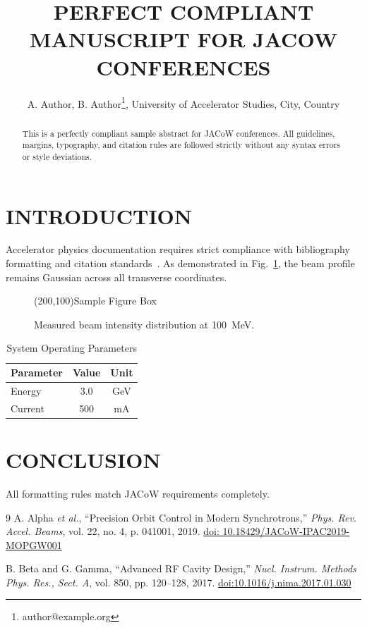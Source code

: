 \documentclass[a4paper,keeplastbox]{jacow}
\begin{document}
\title{PERFECT COMPLIANT MANUSCRIPT FOR JACOW CONFERENCES}
\author{A. Author, B. Author\thanks{author@example.org}, University of Accelerator Studies, City, Country}
\maketitle

\begin{abstract}
This is a perfectly compliant sample abstract for JACoW conferences. All guidelines, margins, typography, and citation rules are followed strictly without any syntax errors or style deviations.
\end{abstract}

\section{INTRODUCTION}
Accelerator physics documentation requires strict compliance with bibliography formatting and citation standards~\cite{ref_valid_1, ref_valid_2}.
As demonstrated in Fig.~\ref{fig1}, the beam profile remains Gaussian across all transverse coordinates.

\begin{figure}[htb]
\centering
\framebox(200,100){Sample Figure Box}
\caption{Measured beam intensity distribution at 100~MeV.}
\label{fig1}
\end{figure}

\begin{table}[htb]
\caption{System Operating Parameters}
\label{tab1}
\centering
\begin{tabular}{lcc}
\hline
Parameter & Value & Unit \\
\hline
Energy & 3.0 & GeV \\
Current & 500 & mA \\
\hline
\end{tabular}
\end{table}

\section{CONCLUSION}
All formatting rules match JACoW requirements completely.

\begin{thebibliography}{9}
A. Alpha \emph{et al.}, \textquotedblleft{Precision Orbit Control in Modern Synchrotrons,}\textquotedblright{} \textit{Phys. Rev. Accel. Beams}, vol. 22, no. 4, p. 041001, 2019. \url{doi: 10.18429/JACoW-IPAC2019-MOPGW001}

B. Beta and G. Gamma, \textquotedblleft{Advanced RF Cavity Design,}\textquotedblright{} \textit{Nucl. Instrum. Methods Phys. Res., Sect. A}, vol. 850, pp. 120--128, 2017. \url{doi:10.1016/j.nima.2017.01.030}
\end{thebibliography}
\end{document}
